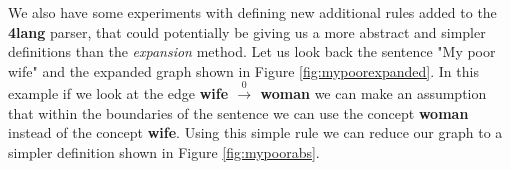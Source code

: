 We also have some experiments with defining new additional rules added to the \textbf{4lang} parser, that could potentially be giving us a more abstract and simpler definitions than the \textit{expansion} method. Let us look back the sentence "My poor wife" and the expanded graph shown in Figure \ref{fig:mypoorexpanded}. In this example if we look at the edge \textbf{wife $\xrightarrow0$ woman} we can make an assumption that within the boundaries of the sentence we can use the concept \textbf{woman} instead of the concept \textbf{wife}. Using this simple rule we can reduce our graph to a simpler definition shown in Figure \ref{fig:mypoorabs}.